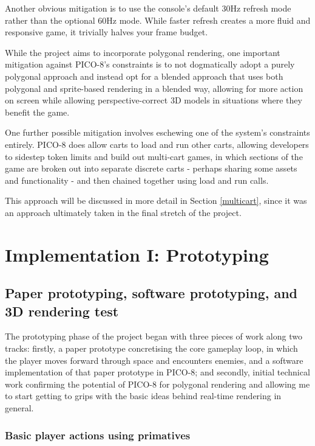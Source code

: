 \documentclass{article}
\begin{document}

Another obvious mitigation is to use the console's default 30Hz refresh mode rather than
the optional 60Hz mode. While faster refresh creates a more fluid and responsive game,
it trivially halves your frame budget.


While the project aims to incorporate polygonal rendering, one important mitigation against
PICO-8's constraints is to not dogmatically adopt a purely polygonal approach and instead
opt for a blended approach that uses both polygonal and sprite-based rendering in a
blended way, allowing for more action on screen while allowing perspective-correct 3D models
in situations where they benefit the game.


One further possible mitigation involves eschewing one of the system's constraints entirely.
PICO-8 does allow carts to load and run other carts, allowing developers to sidestep token
limits and build out multi-cart games, in which sections of the game are broken out into
separate discrete carts - perhaps sharing some assets and functionality - and then chained
together using load and run calls.

This approach will be discussed in more detail in Section \ref{multicart}, since it was an
approach ultimately taken in the final stretch of the project.


\section{Implementation I: Prototyping}

\subsection{Paper prototyping, software prototyping, and 3D rendering test}
The prototyping phase of the project began with three pieces of work along two tracks: firstly,
a paper prototype concretising the core gameplay loop, in which the player moves forward through
space and encounters enemies, and a software implementation of that paper prototype in PICO-8; and
secondly, initial technical work confirming the potential of PICO-8 for polygonal rendering and
allowing me to start getting to grips with the basic ideas behind real-time rendering in general.

\subsubsection*{Basic player actions using primatives}
\end{document}
